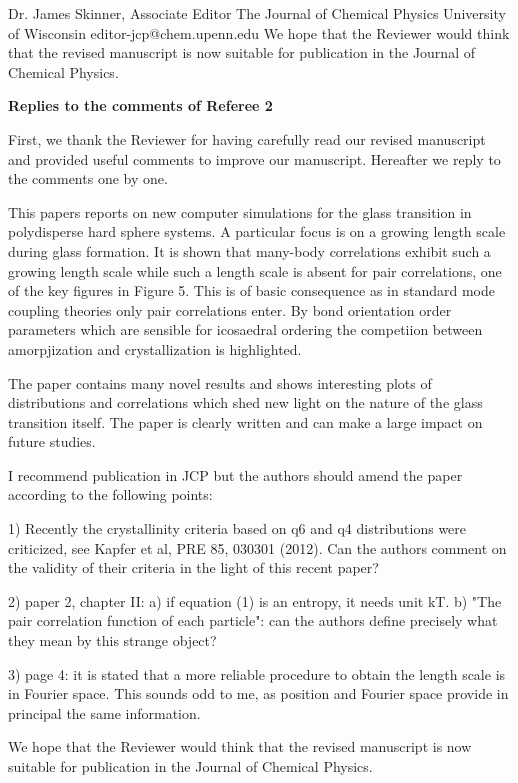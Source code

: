 \documentclass[a4paper, rebuttal, parskip=true, firsthead=false, fromemail=true, foldmarks=false]{scrlttr2}
\begin{document}
\begin{letter}{Dr. James Skinner, Associate Editor
The Journal of Chemical Physics
University of Wisconsin
editor-jcp@chem.upenn.edu }
We hope that the Reviewer would think that the revised manuscript is now suitable for publication in the Journal of Chemical Physics. 


\textsf{\textbf{Replies to the comments of Referee 2}}

First, we thank the Reviewer for having carefully read our revised manuscript and provided useful comments to improve our manuscript. 
Hereafter we reply to the comments one by one.

\begin{quotationi}
This papers reports on new computer simulations for the glass transition
in polydisperse hard sphere systems. A particular focus is on a growing
length scale during glass formation. It is shown that many-body
correlations exhibit such a growing length scale while such a length scale
is absent for pair
correlations, one of the key figures in Figure 5.
This is of basic consequence as in standard mode
coupling theories only pair correlations enter.
By bond orientation
order parameters which are sensible for icosaedral ordering the competiion
between amorpjization and crystallization is highlighted.

The paper contains many novel results and shows interesting plots of
distributions and correlations which shed new light on the nature of
the glass transition itself. The paper is clearly written
and can make a large impact on future studies.

I recommend publication in JCP but the authors should amend the paper
according to the following points:

1) Recently the crystallinity criteria based on q6 and q4 distributions
were criticized, see Kapfer et al, PRE 85, 030301 (2012). Can the authors
comment on the validity of their criteria in the light of this recent paper?
\end{quotationi}

\begin{quotationi}
2) paper 2, chapter II: a) if equation (1) is an entropy, it needs unit kT.
b) "The pair correlation function of each particle": can the authors
define precisely what they mean by this strange object?
\end{quotationi}

\begin{quotationi}
3) page 4: it is stated that a more reliable procedure to obtain the
length scale is in Fourier space. This sounds odd to me, as position and
Fourier space provide in principal the same information.
\end{quotationi}

We hope that the Reviewer would think that the revised manuscript is now suitable for publication in the Journal of Chemical Physics.



\end{letter} 
\end{document}

